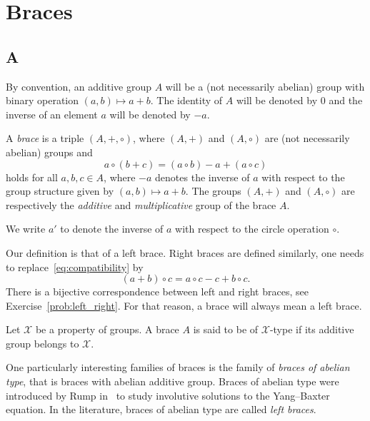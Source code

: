 \chapter{Braces}
\label{braces}

\section*{{{\thesection}A}}

By convention, an additive group $A$ will be a (not necessarily abelian) group 
with binary operation $(a,b)\mapsto a+b$. The 
identity of $A$ will be denoted by $0$ and the inverse of an element $a$ will be denoted by $-a$. 

\begin{definition}
    \label{def:brace}
	A \emph{brace} is a triple $(A,+,\circ)$, where $(A,+)$ and $(A,\circ)$ 
	are (not necessarily abelian) 
	groups and 
	\begin{equation}
	    \label{eq:compatibility}
	    a\circ(b+c)=(a\circ b)-a+(a\circ c)
	\end{equation}
	holds for all $a,b,c\in A$, where $-a$ denotes the inverse of $a$ with
	respect to the group structure given by $(a,b)\mapsto a+b$. The groups 
	$(A,+)$ and $(A,\circ)$ are respectively 
	the \emph{additive} and \emph{multiplicative} group
	of the brace $A$.
\end{definition}

We write $a'$ to denote the inverse of $a$ with respect to the circle operation $\circ$. 

Our definition is that of a left brace. Right braces are defined similarly, one needs 
to replace~\eqref{eq:compatibility} by 
\[
(a+b)\circ c=a\circ c-c+b\circ c.
\]
There is a bijective correspondence between left and right braces, 
see Exercise~\ref{prob:left_right}. For that reason, 
a brace will always mean a left brace. 

\begin{definition}
    Let $\mathcal{X}$ be a property of groups. A brace $A$ is said to be
    of $\mathcal{X}$-type if its additive group belongs to $\mathcal{X}$.
\end{definition}

One particularly interesting families of braces is the family of \emph{braces of abelian type}, 
that is braces with abelian additive group. 
Braces of abelian type were introduced by Rump in~\cite{MR2278047} to study involutive solutions to the Yang--Baxter equation. 
In the literature, braces of abelian type are called \emph{left braces}. 

